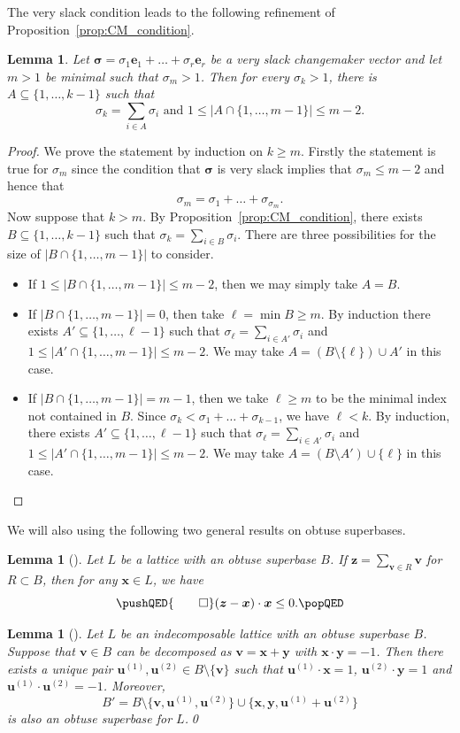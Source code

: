 \documentclass{amsart} %
\newcommand{\e}{\bm{e}}
\newcommand{\bv}{\bm{v}}
\newcommand{\bu}{\bm{u}}
\newcommand{\bsigma}{\bm{\sigma}}
\theoremstyle{thm}
\newtheorem{lem}[Theorem]{Lemma}
\theoremstyle{definition}
\numberwithin{equation}{section}
\begin{document}
The very slack condition leads to the following refinement of Proposition~\ref{prop:CM_condition}.
\begin{lem}\label{lem:veryslack_CM_condition}
Let $\bsigma= \sigma_1 \e_1 + \dots + \sigma_r \e_r$ be a very slack changemaker vector and let $m>1$ be minimal such that $\sigma_m >1$. Then for every $\sigma_k>1$, there is $A\subseteq \{1,\dots, k-1\}$ such that
\[
\text{$\sigma_k = \sum_{i\in A} \sigma_i$ and $1\leq |A \cap \{1, \dots, m-1\}|\leq m-2$.}
\]
\end{lem}
\begin{proof}
We prove the statement by induction on $k\geq m$. Firstly the statement is true for $\sigma_m$ since the condition that $\bsigma$ is very slack implies that $\sigma_m \leq m-2$ and hence that
\[\sigma_m =\sigma_1 + \dots + \sigma_{\sigma_m}.\]
Now suppose that $k>m$. By Proposition~\ref{prop:CM_condition}, there exists $B\subseteq\{1, \dots, k-1\}$ such that $\sigma_k = \sum_{i\in B} \sigma_i$. There are three possibilities for the size of $|B \cap \{1, \dots, m-1\}|$ to consider.
\begin{itemize}
    \item If $1\leq |B \cap \{1, \dots, m-1\}|\leq m-2$, then we may simply take $A=B$.
    \item If $|B \cap \{1, \dots, m-1\}|=0$, then take $\ell=\min B\geq m$. By induction there exists $A'\subseteq \{1, \dots, \ell -1\}$ such that $\sigma_\ell = \sum_{i\in A'} \sigma_i$ and $1\leq |A' \cap \{1, \dots, m-1\}|\leq m-2$. We may take $A=(B\setminus \{\ell\}) \cup A'$ in this case.
    \item If $|B \cap \{1, \dots, m-1\}|=m-1$, then we take $\ell\geq m$ to be the minimal index not contained in $B$. Since $\sigma_k<\sigma_1 + \dots + \sigma_{k-1}$, we have $\ell<k$. By induction, there exists $A'\subseteq \{1, \dots, \ell -1\}$ such that $\sigma_\ell = \sum_{i\in A'} \sigma_i$ and $1\leq |A' \cap \{1, \dots, m-1\}|\leq m-2$. We may take $A=(B\setminus A') \cup \{\ell\}$ in this case.\qedhere
\end{itemize}
\end{proof}
We will also using the following two general results on obtuse superbases.
\begin{lem}[{\cite[Lemma~2.1]{McCoyAltUnknotting}}]\label{lem:vertex_sums}
Let $L$ be a lattice with an obtuse superbase $B$. If $\bm{z}=\sum_{\bv\in R} \bv$ for $R\subset B$, then for any $\bm{x}\in L$, we have
\[
\pushQED{\qed} 
(\bm{z}-\bm{x})\cdot \bm{x}\leq 0.\qedhere
\popQED
\]  
\end{lem}
\begin{lem}[{\cite[Lemma~3.5]{Mc17}}]\label{lem:basis_modification}
 Let $L$ be an indecomposable lattice with an obtuse superbase $B$. Suppose that $\bv\in B$ can be decomposed as $\bv=\bm{x}+\bm{y}$ with $\bm{x}\cdot \bm{y} =-1$. Then there exists a unique pair $\bu^{(1)},\bu^{(2)}\in B\setminus\{\bv\}$ such that $\bu^{(1)}\cdot \bm{x}=1$, $\bu^{(2)}\cdot \bm{y} =1$ and $\bu^{(1)}\cdot \bu^{(2)}=-1$.
Moreover,
\[
B'=B\setminus\{\bv,\bu^{(1)},\bu^{(2)}\}\cup \{\bm{x},\bm{y}, \bu^{(1)}+\bu^{(2)}\}
\]
is also an obtuse superbase for $L$.\qed
 \end{lem}
\end{document}
